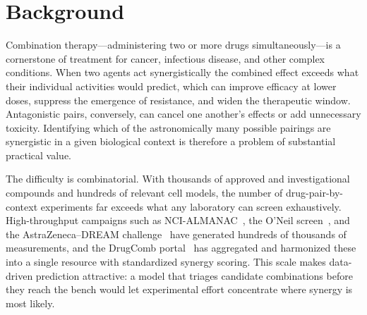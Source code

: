 \documentclass[11pt]{article}
\begin{document}
\begin{abstract}
\smallskip\noindent
\textbf{Conclusions:}
Useful synergy triage is achievable for known entities without molecular features, but standard splits
partly measure memorization of entity-specific base rates and can materially overstate cold-start
deployment performance. The benchmark provides a leakage-controlled lower bound against which richer
molecular and omics models can be measured, and argues that cold-start evaluation should be reported
alongside conventional random or grouped splits.
\medskip

\noindent\textbf{Keywords:} drug synergy; drug combinations; DrugComb; ZIP score; benchmark;
gradient boosting; cold-start generalization; computational pharmacology.
\end{abstract}

\section{Background}
Combination therapy---administering two or more drugs simultaneously---is a cornerstone of treatment
for cancer, infectious disease, and other complex conditions. When two agents act synergistically the
combined effect exceeds what their individual activities would predict, which can improve efficacy at
lower doses, suppress the emergence of resistance, and widen the therapeutic window. Antagonistic
pairs, conversely, can cancel one another's effects or add unnecessary toxicity. Identifying which of
the astronomically many possible pairings are synergistic in a given biological context is therefore a
problem of substantial practical value.

The difficulty is combinatorial. With thousands of approved and investigational compounds and
hundreds of relevant cell models, the number of drug-pair-by-context experiments far exceeds what any
laboratory can screen exhaustively. High-throughput campaigns such as NCI-ALMANAC~\cite{holbeck2017},
the O'Neil screen~\cite{oneil2016}, and the AstraZeneca--DREAM challenge~\cite{menden2019} have
generated hundreds of thousands of measurements, and the DrugComb portal~\cite{zagidullin2019,
zheng2021} has aggregated and harmonized these into a single resource with standardized synergy
scoring. This scale makes data-driven prediction attractive: a model that triages candidate
combinations before they reach the bench would let experimental effort concentrate where synergy is
most likely.
\end{document}
